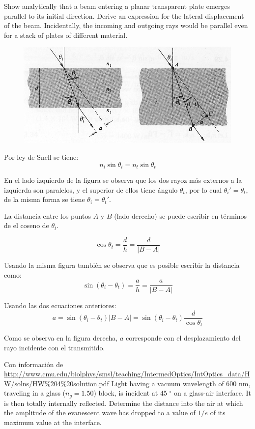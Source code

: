 \documentclass[addpoints,10pt]{exam}
\begin{document}
\begin{questions}
		{
			\question
			Show analytically that a beam entering a planar transparent plate emerges parallel to its initial direction. Derive an expression for the lateral displacement of the beam. Incidentally, the incoming and outgoing rays would be parallel even for a stack of plates of different material.
		}
		
		\begin{figure}[h]
			\centering
			\includegraphics[width = 0.4\linewidth]{demo.png}
		\end{figure}
		
		Por ley de Snell se tiene:
		\begin{equation}
			n_i\sin\theta_i = n_t\sin\theta_t
		\end{equation}
		
		En el lado izquierdo de la figura se observa que los dos rayoz m\'as externos a la izquierda son paralelos, y el superior de ellos tiene \'angulo $\theta_t$, por lo cual $\theta_i' = \theta_t$, de la misma forma se tiene $\theta_i = \theta_t'$.
		
		La distancia entre los puntos $A$ y $B$ (lado derecho) se puede escribir en t\'erminos de el coseno de $\theta_t$.
		
		\begin{equation}
			\cos\theta_t = \dfrac{d}{h} = \dfrac{d}{|B - A|}
		\end{equation}
		
		Usando la misma figura tambi\'en se observa que es posible escribir la distancia como:
		\begin{equation}
			\sin(\theta_i - \theta_t) = \dfrac{a}{h} = \dfrac{a}{|B - A|}
		\end{equation}
		
		Usando las dos ecuaciones anteriores:
		\begin{equation}
			a = \sin(\theta_i - \theta_t)|B - A| = \sin(\theta_i - \theta_t)\dfrac{d}{\cos\theta_t}
		\end{equation}
		
		Como se observa en la figura derecha, $a$ corresponde con el desplazamiento del rayo incidente con el transmitido.
		
		Con informaci\'on de \url{http://www.cmu.edu/biolphys/smsl/teaching/IntermedOptics/IntOptics_data/HW/solns/HW\%204\%20solution.pdf}
		{
			\question
			Light having a vacuum wavelength of 600 nm, traveling in a glass ($n_g = 1.50$) block, is incident at 45 $^\circ$ on a glass-air interface. It is then totally internally reflected. Determine the distance into the air at which the amplitude of the evanescent wave has dropped to a value of $1/e$ of its maximum value at the interface.
		}
		

\end{questions}
\end{document}
